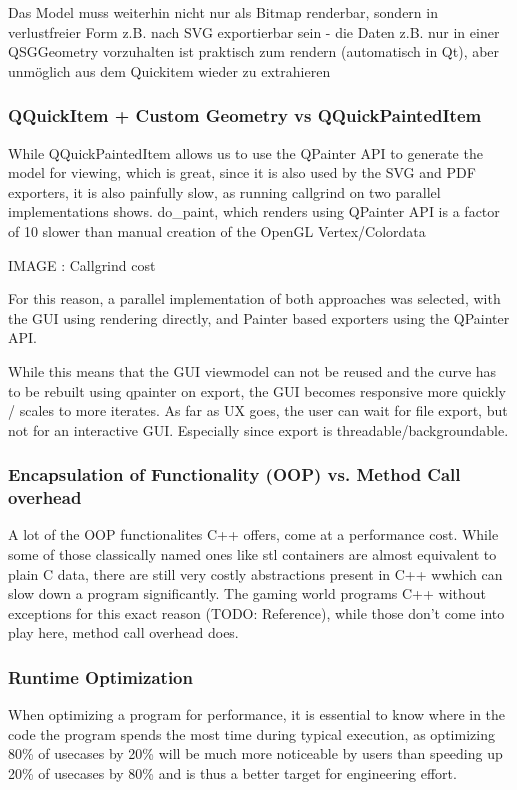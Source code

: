 Das Model muss weiterhin nicht nur als Bitmap renderbar, sondern in verlustfreier Form z.B. nach SVG exportierbar sein - die Daten z.B. nur in einer QSGGeometry vorzuhalten ist praktisch zum rendern (automatisch in Qt), aber unmöglich aus dem Quickitem wieder zu extrahieren
\subsubsection{QQuickItem + Custom Geometry vs QQuickPaintedItem}
While QQuickPaintedItem allows us to use the QPainter API to generate the model for viewing, which is great, since it is also used by the SVG and PDF exporters, it is also painfully slow, as running callgrind on two parallel implementations shows.
do\_paint, which renders using QPainter API is a factor of 10 slower than manual creation of the OpenGL Vertex/Colordata

IMAGE : Callgrind cost

For this reason, a parallel implementation of both approaches was selected, with the GUI using rendering directly, and Painter based exporters using the QPainter API.

While this means that the GUI viewmodel can not be reused and the curve has to be rebuilt using qpainter on export, the GUI becomes responsive more quickly / scales to more iterates. As far as UX goes, the user can wait for file export, but not for an interactive GUI.
Especially since export is threadable/backgroundable.

\subsubsection{Encapsulation of Functionality (OOP) vs. Method Call overhead}
A lot of the OOP functionalites C++ offers, come at a performance cost.
While some of those classically named ones like stl containers are almost equivalent to plain C data, there are still very costly abstractions present in C++ wwhich can slow down a program significantly.
The gaming world programs C++ without exceptions for this exact reason (TODO: Reference), while those don't come into play here, method call overhead does.


\subsubsection{Runtime Optimization}
When optimizing a program for performance, it is essential to know where in the code the program spends the most time during typical execution, as optimizing 80\% of usecases by 20\% will be much more noticeable by users than speeding up 20\% of usecases by 80\% and is thus a better target for engineering effort.

